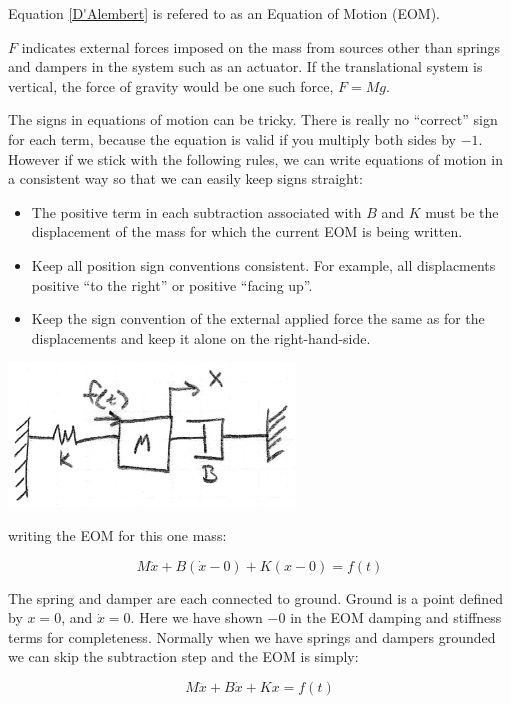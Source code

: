 Equation \ref{D'Alembert} is refered to as an Equation of Motion (EOM).

$F$ indicates external forces imposed on the mass from sources other than springs and dampers in the system such as an actuator.  If the translational system is vertical, the force of gravity would be one such force, $F=Mg$.

The signs in equations of motion can be tricky.   There is really no ``correct'' sign for each term,
because the equation is valid if you multiply both sides by $-1$.   However if we stick with the
following rules, we can write equations of motion in a consistent way so that we can easily keep
signs straight:

\begin{itemize}

  \item The positive term in each subtraction associated with $B$ and $K$ must be the displacement of the mass for which the current EOM is being written.
  \item Keep all position sign conventions consistent.  For example, all displacments positive ``to the right'' or positive ``facing up''.
  \item Keep the sign convention of the external applied force the same as for the displacements and keep it alone on the right-hand-side.

\end{itemize}






\begin{ExampleSmall}

\includegraphics[width=3.0in]{figs02/00721a.png}

writing the EOM for this one mass:

\[
M\ddot{x} + B(\dot{x} - 0) + K(x-0) = f(t)
\]

The spring and damper are each connected to ground.  Ground is a point defined by $x=0$, and $\dot{x}=0$.   Here we have shown $-0$ in the EOM damping and stiffness terms for completeness.
Normally when we have springs and dampers grounded we can skip the subtraction step and the EOM is simply:

\[
M\ddot{x} + B\dot{x} + Kx = f(t)
\]

\end{ExampleSmall}





